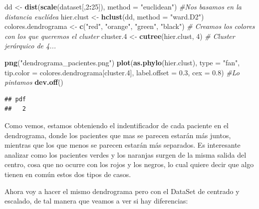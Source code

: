 \documentclass[]{article}
\newenvironment{Shaded}{\begin{snugshade}}{\end{snugshade}}
\newcommand{\KeywordTok}[1]{\textcolor[rgb]{0.13,0.29,0.53}{\textbf{#1}}}
\newcommand{\DataTypeTok}[1]{\textcolor[rgb]{0.13,0.29,0.53}{#1}}
\newcommand{\DecValTok}[1]{\textcolor[rgb]{0.00,0.00,0.81}{#1}}
\newcommand{\FloatTok}[1]{\textcolor[rgb]{0.00,0.00,0.81}{#1}}
\newcommand{\StringTok}[1]{\textcolor[rgb]{0.31,0.60,0.02}{#1}}
\newcommand{\CommentTok}[1]{\textcolor[rgb]{0.56,0.35,0.01}{\textit{#1}}}
\newcommand{\OperatorTok}[1]{\textcolor[rgb]{0.81,0.36,0.00}{\textbf{#1}}}
\newcommand{\NormalTok}[1]{#1}
\begin{document}
\begin{Shaded}
\begin{Highlighting}[]
\NormalTok{dd <-}\StringTok{ }\KeywordTok{dist}\NormalTok{(}\KeywordTok{scale}\NormalTok{(dataset[,}\DecValTok{2}\OperatorTok{:}\DecValTok{25}\NormalTok{]), }\DataTypeTok{method =} \StringTok{"euclidean"}\NormalTok{) }\CommentTok{#Nos basamos en la distancia euclídea}
\NormalTok{hier.clust <-}\StringTok{ }\KeywordTok{hclust}\NormalTok{(dd, }\DataTypeTok{method =} \StringTok{"ward.D2"}\NormalTok{)}
\NormalTok{colores.dendrograma <-}\StringTok{ }\KeywordTok{c}\NormalTok{(}\StringTok{"red"}\NormalTok{, }\StringTok{"orange"}\NormalTok{, }\StringTok{"green"}\NormalTok{, }\StringTok{"black"}\NormalTok{) }\CommentTok{# Creamos los colores con los que queremos el cluster}
\NormalTok{cluster.}\DecValTok{4}\NormalTok{ <-}\StringTok{ }\KeywordTok{cutree}\NormalTok{(hier.clust, }\DecValTok{4}\NormalTok{) }\CommentTok{# Cluster jerárquico de 4...}

\KeywordTok{png}\NormalTok{(}\StringTok{"dendrograma_pacientes.png"}\NormalTok{)}
\KeywordTok{plot}\NormalTok{(}\KeywordTok{as.phylo}\NormalTok{(hier.clust), }\DataTypeTok{type =} \StringTok{"fan"}\NormalTok{, }\DataTypeTok{tip.color =}\NormalTok{ colores.dendrograma[cluster.}\DecValTok{4}\NormalTok{], }\DataTypeTok{label.offset =} \FloatTok{0.3}\NormalTok{, }\DataTypeTok{cex =} \FloatTok{0.8}\NormalTok{) }\CommentTok{#Lo pintamos}
\KeywordTok{dev.off}\NormalTok{()}
\end{Highlighting}
\end{Shaded}

\begin{verbatim}
## pdf 
##   2
\end{verbatim}

Como vemos, estamos obteniendo el indentificador de cada paciente en el
dendrograma, donde los pacientes que mas se parecen estarán más juntos,
mientras que los que menos se parecen estarán más separados. Es
interesante analizar como los pacientes verdes y los naranjas surgen de
la misma salida del centro, cosa que no ocurre con los rojos y los
negros, lo cual quiere decir que algo tienen en común estos dos tipos de
casos.

Ahora voy a hacer el mismo dendrograma pero con el DataSet de centrado y
escalado, de tal manera que veamos a ver si hay diferencias:
\end{document}
